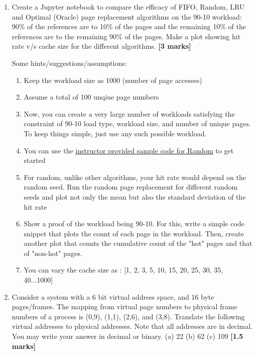 \documentclass[]{article}
\begin{document}
\begin{enumerate}
	\item Create a Jupyter notebook to compare the efficacy of FIFO, Random, LRU and Optimal (Oracle) page replacement algorithms on the 90-10 workload: 90\% of the references are to 10\% of the pages and the remaining 10\% of the references are to the remaining 90\% of the pages. Make a plot showing hit rate v/s cache size for the different algorithms. \textbf{[3 marks]}
	
	Some hints/suggestions/assumptions:
	\begin{enumerate}
		\item Keep the workload size as 1000 (number of page accesses)
		\item Assume a total of 100 unqiue page numbers
		\item Now, you can create a very large number of workloads satisfying the constraint of 90-10 load type, workload size, and number of unique pages. To keep things simple, just use any such possible workload. 
		\item You can use the
		 \underline{\href{https://github.com/nipunbatra/nipunbatra.github.io/blob/master/teaching/os-fall-18/code/replacement-random-plot.py}{instructor provided sample code for Random}} to get started
	\item For random, unlike other algorithms, your hit rate would depend on the random seed. Run the random page replacement for different random seeds and plot not only the mean but also the standard deviation of the hit rate
	\item Show a proof of the workload being 90-10. For this, write a simple code snippet that plots the count of each page in the workload. Then, create another plot that counts the cumulative count of the "hot" pages and that of "non-hot" pages.
	\item You can vary the cache size as : [1, 2, 3, 5, 10, 15, 20, 25, 30, 35, 40...1000]
	\end{enumerate}



	
	
	\item Consider a system with a 6 bit virtual address space, and 16 byte pages/frames. The mapping
	from virtual page numbers to physical frame numbers of a process is (0,9), (1,1), (2,6), and
	(3,8). Translate the following virtual addresses to physical addresses. Note that all addresses
	are in decimal. You may write your answer in decimal or binary.  
	(a) 22
	(b) 62
	(c) 109 \textbf{[1.5 marks]}
	

\end{enumerate}
\end{document}
